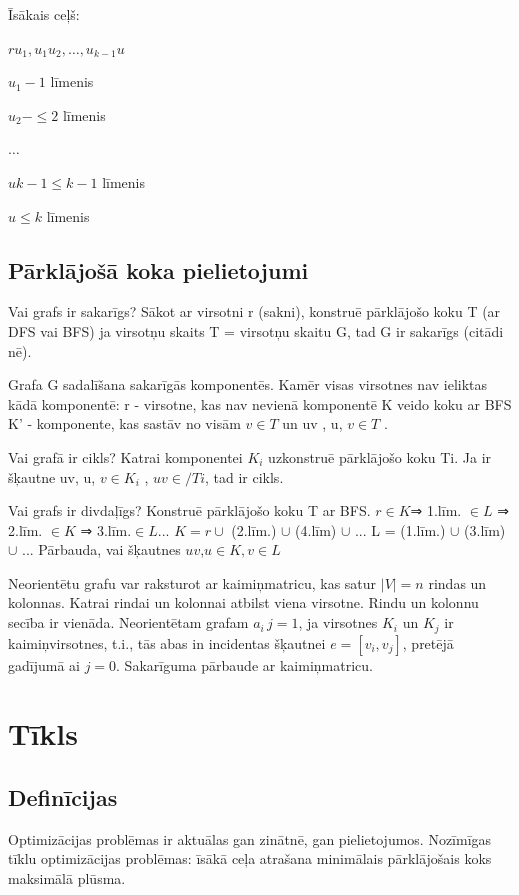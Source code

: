 \documentclass{article}
\begin{document}
Īsākais ceļš: 

$ru_1 , u_1 u_2 , \ldots,u_{k -1}u$

$u_1 - 1$ līmenis

$u_2 − \le 2$ līmenis

$\ldots$

$u{k −1} \le k-1$ līmenis

$u \le k$ līmenis

\subsection{Pārklājošā koka pielietojumi}

Vai grafs ir sakarīgs? Sākot ar virsotni r (sakni), konstruē pārklājošo koku T (ar DFS vai BFS) ja virsotņu skaits T = virsotņu skaitu G, tad G ir sakarīgs (citādi nē).

Grafa G sadalīšana sakarīgās komponentēs. 
Kamēr visas virsotnes nav ieliktas kādā komponentē: r - virsotne, kas nav nevienā komponentē K veido koku ar BFS K' - komponente, kas sastāv no visām $v \in T$ un uv , u, $v \in T$ .  

Vai grafā ir cikls?  Katrai komponentei $K_i$ uzkonstruē pārklājošo koku Ti. Ja ir šķautne uv, u, $v \in K_i$ , $uv \in / Ti$, tad ir cikls. 

Vai grafs ir divdaļīgs?  Konstruē pārklājošo koku T ar BFS.
$r \in K $⇒ 1.līm. $\in L$ ⇒ 2.līm. $\in K$ ⇒ 3.līm.$ \in L$...
$K = r \cup $ (2.līm.) $\cup$ (4.līm) $\cup$ ...
L = (1.līm.) $\cup$ (3.līm) $\cup$ ...
Pārbauda, vai šķautnes $uv$,$u \in K , v \in L$ 

Neorientētu grafu var raksturot ar kaimiņmatricu, kas satur $|V | = n$ rindas un kolonnas.  Katrai rindai un kolonnai atbilst viena virsotne.  Rindu un kolonnu secība ir vienāda.  Neorientētam grafam $a_i \, j = 1$, ja virsotnes $K_i$ un $K_j$ ir kaimiņvirsotnes, t.i., tās abas in incidentas šķautnei $e = [v_i , v_j ]$, pretējā gadījumā ai $j = 0$.  
Sakarīguma pārbaude ar kaimiņmatricu.


\section{Tīkls}

\subsection{Definīcijas}
Optimizācijas problēmas ir aktuālas gan zinātnē, gan pielietojumos.  Nozīmīgas tīklu optimizācijas problēmas: īsākā ceļa atrašana minimālais pārklājošais koks maksimālā plūsma.
\end{document}

